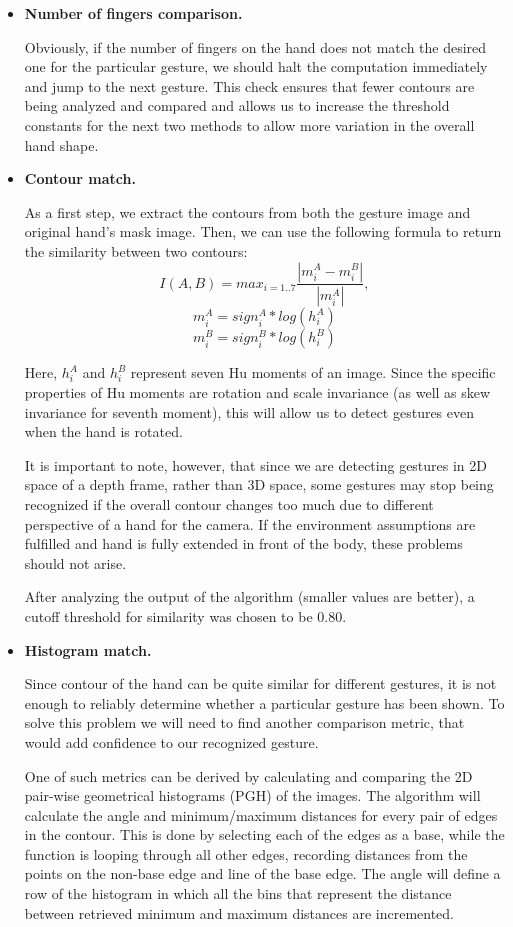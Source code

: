 \documentclass[a4paper,11pt,oneside]{article}
\begin{document}
\begin{itemize}
\item \textbf{Number of fingers comparison.}

Obviously, if the number of fingers on the hand does not match the desired one for the particular gesture, we should halt the computation immediately and jump to the next gesture. This check ensures that fewer contours are being analyzed and compared and allows us to increase the threshold constants for the next two methods to allow more variation in the overall hand shape.\\

\item \textbf{Contour match.}

As a first step, we extract the contours from both the gesture image and original hand's mask image. Then, we can use the following formula to return the similarity between two contours:
\[ I(A,B) = max_{i=1..7} \frac{|m_i^A - m_i^B|}{|m_i^A|}, \]
\[  m_i^A = sign_i^A * log (h_i^A) \]
\[  m_i^B = sign_i^B * log (h_i^B )\]

Here, $h_i^A$ and $h_i^B$ represent seven Hu moments \cite{ZH02} of an image. Since the specific properties of Hu moments are rotation and scale invariance (as well as skew invariance for seventh moment), this will allow us to detect gestures even when the hand is rotated.

It is important to note, however, that since we are detecting gestures in 2D space of a depth frame, rather than 3D space, some gestures may stop being recognized if the overall contour changes too much due to different perspective of a hand for the camera.  If the environment assumptions are fulfilled and hand is fully extended in front of the body, these problems should not arise.

After analyzing the output of the algorithm (smaller values are better), a cutoff threshold for similarity was chosen to be 0.80.\\

\item \textbf{Histogram match.}

Since contour of the hand can be quite similar for different gestures, it is not enough to reliably determine whether a particular gesture has been shown. To solve this problem we will need to find another comparison metric, that would add confidence to our recognized gesture.

One of such metrics can be derived by calculating and comparing the 2D pair-wise geometrical histograms (PGH) \cite{SC01} of the images. The algorithm will calculate the angle and minimum/maximum distances for every pair of edges in the contour. This is done by selecting each of the edges as a base, while the function is looping through all other edges, recording distances from the points on the non-base edge and line of the base edge. The angle will define a row of the histogram in which all the bins that represent the distance between retrieved minimum and maximum distances are incremented.


\end{itemize}
\end{document}
